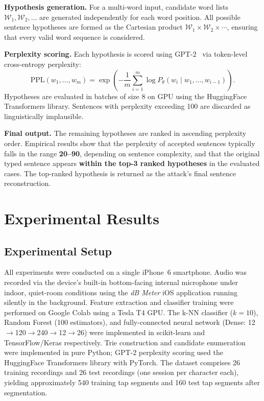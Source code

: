 \documentclass[conference]{IEEEtran}
\begin{document}
\textbf{Hypothesis generation.}
For a multi-word input, candidate word lists
$\mathcal{W}_1, \mathcal{W}_2, \ldots$ are generated independently
for each word position.
All possible sentence hypotheses are formed as the Cartesian product
$\mathcal{W}_1 \times \mathcal{W}_2 \times \cdots$, ensuring that
every valid word sequence is considered.

\textbf{Perplexity scoring.}
Each hypothesis is scored using GPT-2~\cite{radford2019gpt2} via
token-level cross-entropy perplexity:
\begin{equation}
\mathrm{PPL}(w_1, \ldots, w_m)
    = \exp\!\left(
        -\frac{1}{m}\sum_{i=1}^{m}
        \log P_\theta(w_i \mid w_1,\ldots,w_{i-1})
      \right).
\end{equation}
Hypotheses are evaluated in batches of size 8 on GPU using the
HuggingFace Transformers library.
Sentences with perplexity exceeding 100 are discarded as
linguistically implausible.

\textbf{Final output.}
The remaining hypotheses are ranked in ascending perplexity order.
Empirical results show that the perplexity of accepted sentences
typically falls in the range \textbf{20--90}, depending on sentence
complexity, and that the original typed sentence appears \textbf{within the top-3 ranked hypotheses} in the evaluated cases. The top-ranked hypothesis is returned as the attack's final sentence reconstruction.
















\section{Experimental Results}\label{sec:results}

\subsection{Experimental Setup}

All experiments were conducted on a single iPhone~6 smartphone. Audio was recorded via the device's built-in bottom-facing internal microphone under indoor, quiet-room conditions using the \textit{dB Meter} iOS application running silently in the background. Feature extraction and classifier training were performed on Google Colab using a Tesla T4 GPU. The k-NN classifier ($k{=}10$), Random Forest (100 estimators), and fully-connected neural network (Dense:  12$\to$120$\to$240$\to$12$\to$26)
were implemented in scikit-learn and TensorFlow/Keras respectively. Trie construction and candidate enumeration were implemented in pure
Python; GPT-2 perplexity scoring used the HuggingFace Transformers library with PyTorch.
The dataset comprises 26 training recordings and 26 test recordings
(one session per character each), yielding approximately 540
training tap segments and 160 test tap segments after segmentation.
\end{document}
